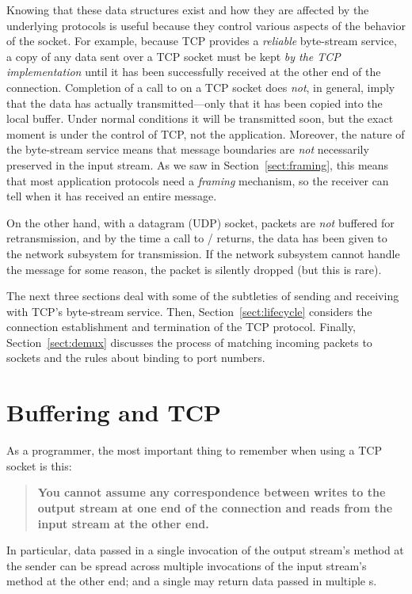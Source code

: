 Knowing that these data structures exist and how they are affected by
the underlying protocols is useful because they control various
aspects of the behavior of the socket.
For example, because TCP
provides a \emph{reliable} byte-stream service, a copy of any data
sent over a TCP socket must be kept \emph{by the TCP implementation}
until it has been successfully received at the other end of the
connection.
Completion of a call to  on a TCP socket
does \emph{not}, in general,
imply that the data has actually transmitted---only that it has
been copied into the local buffer.  Under normal conditions it will be
transmitted soon, but the exact moment is under the control of TCP,
not the application.
Moreover, the nature of the
byte-stream service means that message boundaries are \emph{not\/} necessarily
preserved in the input stream.  As we saw in
Section~\ref{sect:framing}, this means that most application protocols
need a \emph{framing\/} mechanism, so the receiver can tell when it has
received an entire message.

On the other hand, with a datagram (UDP) socket, 
packets are
\emph{not} buffered for retransmission, and by the time a call to
/ returns, the data has been
given to the network subsystem for transmission. If the network
subsystem cannot handle the message for some reason, the packet is
silently dropped (but this is rare).

The next three sections deal with some of the subtleties of sending
and receiving with TCP's byte-stream service.  Then,
Section~\ref{sect:lifecycle} considers the connection establishment
and termination of the TCP protocol.  Finally,
Section~\ref{sect:demux} discusses the process of matching incoming
packets to sockets and the rules about binding to port numbers.

\section{Buffering and TCP}
\label{sect:sendrec}%

As a programmer, the most important thing to remember when using a TCP
socket is this:

\begin{quote}
\textbf{You cannot assume any correspondence between
writes to the output stream at one end of the connection
and reads from the input stream at  the other end.}
\end{quote}

In particular, data passed in a single invocation of the output
stream's  method at the sender can
be spread across multiple invocations of the input stream's
 method at the other end; and a
single  may return data passed in
multiple s.

